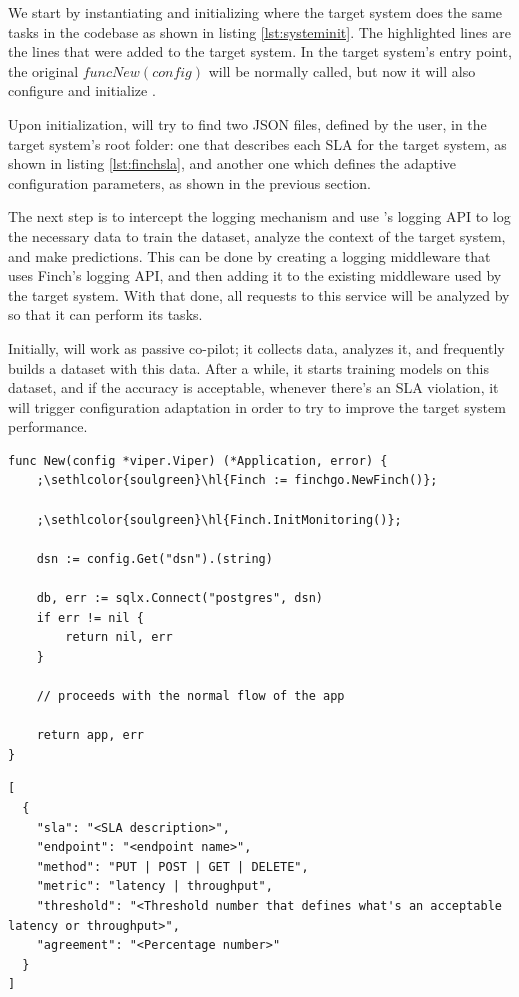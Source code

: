 We start by instantiating and initializing \projectname{} where the target system does the same tasks in the codebase as shown in listing \ref{lst:systeminit}. The highlighted lines are the lines that were added to the target system. In the target system's entry point, the original $func New(config)$ will be normally called, but now it will also configure and initialize \projectname{}.

Upon initialization, \projectname{} will try to find two JSON files, defined by the user, in the target system's root folder: one that describes each SLA for the target system, as shown in listing \ref{lst:finchsla}, and another one which defines the adaptive configuration parameters, as shown in the previous section.

The next step is to intercept the logging mechanism and use \projectname{}'s logging API to log the necessary data to train the dataset, analyze the context of the target system, and make predictions. This can be done by creating a logging middleware that uses Finch's logging API, and then adding it to the existing middleware used by the target system. With that done, all requests to this service will be analyzed by \projectname{} so that it can perform its tasks.

Initially, \projectname{} will work as passive co-pilot; it collects data, analyzes it, and frequently builds a dataset with this data. After a while, it starts training models on this dataset, and if the accuracy is acceptable, whenever there's an SLA violation, it will trigger configuration adaptation in order to try to improve the target system performance.

\begin{lstlisting}[float,floatplacement=H,escapechar=;,caption={Initializing the target system and Finch},label={lst:systeminit}]
func New(config *viper.Viper) (*Application, error) {
	;\sethlcolor{soulgreen}\hl{Finch := finchgo.NewFinch()};
	
	;\sethlcolor{soulgreen}\hl{Finch.InitMonitoring()};

	dsn := config.Get("dsn").(string)
	
	db, err := sqlx.Connect("postgres", dsn)
	if err != nil {
		return nil, err
	}

	// proceeds with the normal flow of the app
	
	return app, err
}
\end{lstlisting}

\begin{lstlisting}[float,floatplacement=H,caption={finch\_sla.json describe each SLA in the target system},label={lst:finchsla}]
[
  {
    "sla": "<SLA description>",
    "endpoint": "<endpoint name>",
    "method": "PUT | POST | GET | DELETE",
    "metric": "latency | throughput",
    "threshold": "<Threshold number that defines what's an acceptable latency or throughput>",
    "agreement": "<Percentage number>"
  }
]
\end{lstlisting}

